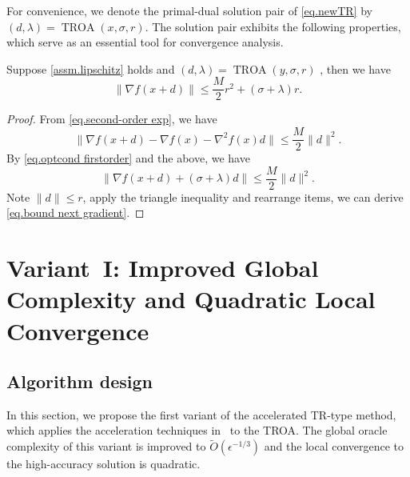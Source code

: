 \documentclass{article}
\begin{document}
For convenience, we denote the primal-dual solution pair of \eqref{eq.newTR} by $(d,\lambda) = \operatorname{TROA}(x, \sigma, r)$. The solution pair exhibits the following properties, which serve as an essential tool for convergence analysis.
\begin{lemma}
    \label{lem.bound next gradient}
    Suppose \autoref{assm.lipschitz} holds and $(d,\lambda)= \operatorname{TROA}(y,\sigma,r)$ , then we have
    \begin{equation}
        \label{eq.bound next gradient}
        \|\nabla f(x+d)\| \leq \frac{M}{2}r^2+(\sigma+\lambda)r.
    \end{equation}
\end{lemma}
\begin{proof}
    From \eqref{eq.second-order exp}, we have
    \begin{equation*}
        \|\nabla f(x+d)- \nabla f(x) -\nabla ^2 f(x) d\| \leq \frac{M}{2}\|d\|^2.
    \end{equation*}
    By \eqref{eq.optcond firstorder} and the above, we have
    \begin{equation*}
        \|\nabla f(x+d)+(\sigma+\lambda) d\| \leq \frac{M}{2}\|d\|^2.
    \end{equation*}
    Note $\|d\|\leq r$, apply the triangle inequality and rearrange items, we can derive \eqref{eq.bound next gradient}.
\end{proof}

\section{Variant~I: Improved Global Complexity and Quadratic Local Convergence}\label{sec.first variant}
\subsection{Algorithm design}
In this section, we propose the first variant of the accelerated TR-type method, which applies the acceleration techniques in~\cite{nesterov2008accelerating} to the TROA. The global oracle complexity of this variant is improved to $\tilde O(\epsilon^{-1/3})$ and the local convergence to the high-accuracy solution is quadratic.
\end{document}
